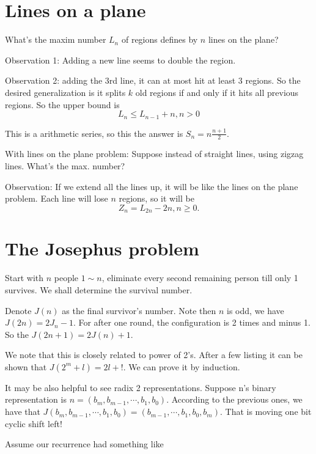 \section{Lines on a plane}

 What's the maxim number $L_{n}$ of regions defines by $n$ lines on the plane?  


Observation 1: Adding a new line seems to double the region.

Observation 2: adding the 3rd line, it can at most hit at least 3 regions. So
the desired generalization is  it splits $k$ old regions if and only if it hits
all previous regions. So the upper bound is 
\[
    L_{n} \leq L_{n-1}+n,n>0
\]

This is a arithmetic series, so this the answer is $S_n=n\frac{n+1}{2}$. 

 With lines on the plane problem: Suppose instead of
straight lines, using zigzag lines. What's the max. number? 

Observation: If we extend all the lines up, it will be like the lines on the
plane problem. Each line will lose $n$ regions, so it will be 
\[
    Z_{n}= L_{2n}-2n, n \geq 0.
\]
\section{The Josephus problem} 

 Start with $n$ people $1\sim n$, eliminate every second
remaining person till only 1 survives. We shall determine the survival number. 

 Denote $J(n)$ as the final survivor's number. Note
then $n$ is odd, we have $J(2n)=2J_n-1$. For after one round, the configuration is
2 times and minus 1. So the $J(2n+1)=2J(n)+1.$ 

 We note that this is closely related to power of 2's. After a
few listing it can be shown that $J(2^{m}+l)=2l+!$. We can prove it by
induction.  

It may be also helpful to see radix 2 representations. Suppose n's binary
representation is $n=(b_m, b_{m-1},\cdots, b_1,b_0)$. According to the previous
ones, we have that  $J(b_m, b_{m-1},\cdots,
b_1,b_0)=(b_{m-1},\cdots,b_1,b_0,b_m)$. That is moving one bit cyclic shift
left! 

 Assume our recurrence had something like 

